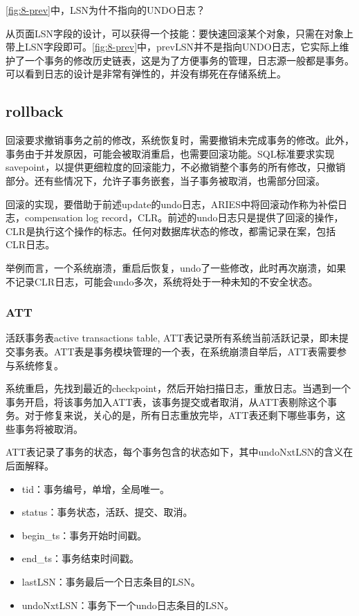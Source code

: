 \begin{exercise}
    \figurename\ref{fig:8-prev}中，LSN为什不指向的UNDO日志？
\end{exercise}

从页面LSN字段的设计，可以获得一个技能：要快速回滚某个对象，只需在对象上带上LSN字段即可。\figurename\ref{fig:8-prev}中，prevLSN并不是指向UNDO日志，它实际上维护了一个事务的修改历史链表，这是为了方便事务的管理，日志源一般都是事务。可以看到日志的设计是非常有弹性的，并没有绑死在存储系统上。

\subsection{rollback}

回滚要求撤销事务之前的修改，系统恢复时，需要撤销未完成事务的修改。此外，事务由于并发原因，可能会被取消重启，也需要回滚功能。SQL标准要求实现savepoint，以提供更细粒度的回滚能力，不必撤销整个事务的所有修改，只撤销部分。还有些情况下，允许子事务嵌套，当子事务被取消，也需部分回滚。

回滚的实现，要借助于前述update的undo日志，ARIES中将回滚动作称为补偿日志，compensation log record，CLR。前述的undo日志只是提供了回滚的操作，CLR是执行这个操作的标志。任何对数据库状态的修改，都需记录在案，包括CLR日志。

举例而言，一个系统崩溃，重启后恢复，undo了一些修改，此时再次崩溃，如果不记录CLR日志，可能会undo多次，系统将处于一种未知的不安全状态。

\subsubsection*{ATT}

活跃事务表active transactions table, ATT表记录所有系统当前活跃记录，即未提交事务表。ATT表是事务模块管理的一个表，在系统崩溃自举后，ATT表需要参与系统修复。

系统重启，先找到最近的checkpoint，然后开始扫描日志，重放日志。当遇到一个事务开启，将该事务加入ATT表，该事务提交或者取消，从ATT表剔除这个事务。对于修复来说，关心的是，所有日志重放完毕，ATT表还剩下哪些事务，这些事务将被取消。

ATT表记录了事务的状态，每个事务包含的状态如下，其中undoNxtLSN的含义在后面解释。

\begin{itemize}
    \item tid：事务编号，单增，全局唯一。
    \item status：事务状态，活跃、提交、取消。
    \item begin\_ts：事务开始时间戳。
    \item end\_ts：事务结束时间戳。
    \item lastLSN：事务最后一个日志条目的LSN。
    \item undoNxtLSN：事务下一个undo日志条目的LSN。
\end{itemize}


